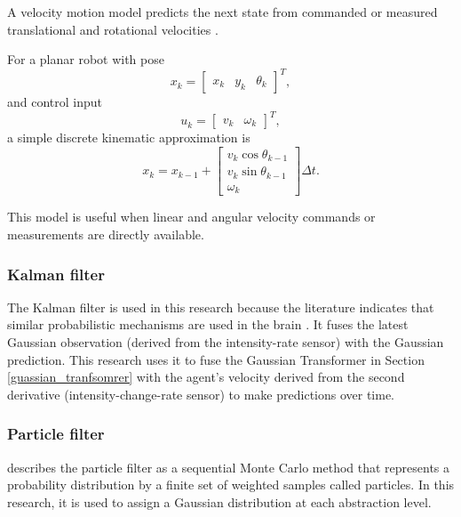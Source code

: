 \documentclass[a4paper]{article}
\begin{document}
            A velocity motion model predicts the next state from commanded or measured translational and rotational velocities \cite{thrun-2005-probabilistic-robotics}.

            For a planar robot with pose
            \[
            x_k =
            \begin{bmatrix}
               x_k & y_k & \theta_k
            \end{bmatrix}^{T},
            \]
            and control input
            \[
            u_k =
            \begin{bmatrix}
               v_k & \omega_k
            \end{bmatrix}^{T},
            \]
            a simple discrete kinematic approximation is
            \[
            x_k =
            x_{k-1}
            +
            \begin{bmatrix}
               v_k\cos\theta_{k-1}\\
               v_k\sin\theta_{k-1}\\
               \omega_k
            \end{bmatrix}
            \Delta t.
            \]

            This model is useful when linear and angular velocity commands or measurements are directly available.
         \subsubsection{Kalman filter}
            The Kalman filter \cite{kalman-1960-a-new-approach-to-linear-filtering-and-prediction-problems} is used in this research because the literature indicates that similar probabilistic mechanisms are used in the brain \cite{wolpert-2007-probabilistic-models-in-human-sensorimotor-control}. It fuses the latest Gaussian observation (derived from the intensity-rate sensor) with the Gaussian prediction. This research uses it to fuse the Gaussian Transformer in Section \ref{guassian_tranfsomrer} with the agent's velocity derived from the second derivative (intensity-change-rate sensor) to make predictions over time.

         \subsubsection{Particle filter}
            \cite{arulampalam-2002-a-tutorial-on-particle-filters-for-online-nonlinear-non-gaussian-bayesian-tracking} describes the particle filter as a sequential Monte Carlo method that represents a probability distribution by a finite set of weighted samples called particles. In this research, it is used to assign a Gaussian distribution at each abstraction level.
\end{document}
